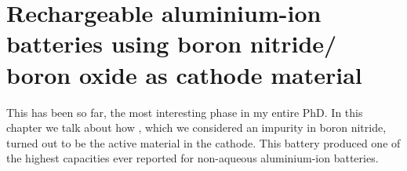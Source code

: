 \chapter{Rechargeable aluminium-ion batteries using boron nitride/ boron oxide as cathode material} %
This has been so far, the most interesting phase in my entire PhD. In this chapter we talk about how , which we considered an impurity in boron nitride, turned out to be the active material in the cathode. This battery produced one of the highest capacities ever reported for non-aqueous aluminium-ion batteries.   \label{BOhBN} %
\newcommand{\keyword}[1]{\textbf{#1}}
\newcommand{\tabhead}[1]{\textbf{#1}}
\newcommand{\code}[1]{\texttt{#1}}
\newcommand{\file}[1]{\texttt{\bfseries#1}}
\newcommand{\option}[1]{\texttt{\itshape#1}}
